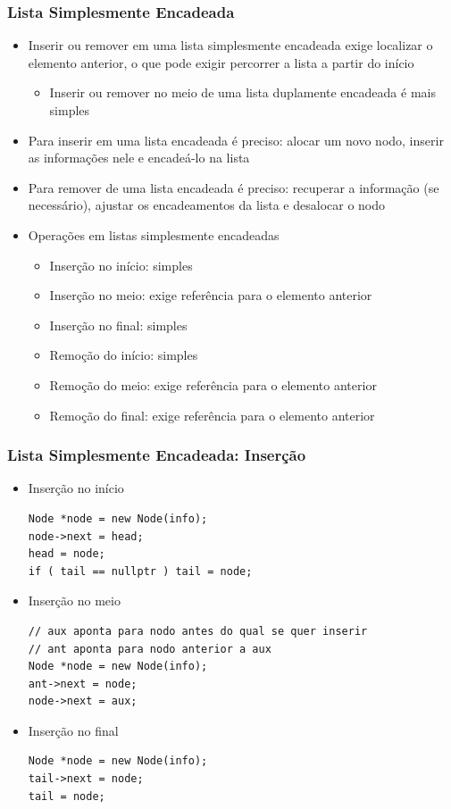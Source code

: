 \documentclass[aspectratio=169]{beamer}
\begin{document}
\begin{frame}[fragile]\frametitle{Lista Simplesmente Encadeada}
\begin{itemize}
	\item Inserir ou remover em uma lista simplesmente encadeada exige localizar o elemento anterior, o que pode exigir percorrer a lista a partir do início
	\begin{itemize}
		\item Inserir ou remover no meio de uma lista duplamente encadeada é mais simples
	\end{itemize}
	\item Para inserir em uma lista encadeada é preciso: alocar um novo nodo, inserir as informações nele e encadeá-lo na lista
	\item Para remover de uma lista encadeada é preciso: recuperar a informação (se necessário), ajustar os encadeamentos da lista e desalocar o nodo
	\item Operações em listas simplesmente encadeadas
	\begin{itemize}
		\item Inserção no início: simples
		\item Inserção no meio: exige referência para o elemento anterior
		\item Inserção no final: simples
		\item Remoção do início: simples
		\item Remoção do meio: exige referência para o elemento anterior
		\item Remoção do final: exige referência para o elemento anterior
	\end{itemize}
\end{itemize}
\end{frame}

\begin{frame}[fragile]\frametitle{Lista Simplesmente Encadeada: Inserção}
\begin{itemize}
	\item Inserção no início
\begin{lstlisting}[basicstyle=\ttfamily\scriptsize]
Node *node = new Node(info);
node->next = head;
head = node;
if ( tail == nullptr ) tail = node;
\end{lstlisting}
	\item Inserção no meio
\begin{lstlisting}[basicstyle=\ttfamily\scriptsize]
// aux aponta para nodo antes do qual se quer inserir
// ant aponta para nodo anterior a aux
Node *node = new Node(info);
ant->next = node;
node->next = aux;
\end{lstlisting}
	\item Inserção no final
\begin{lstlisting}[basicstyle=\ttfamily\scriptsize]
Node *node = new Node(info);
tail->next = node;
tail = node;
\end{lstlisting}
\end{itemize}
\end{frame}
\end{document}
